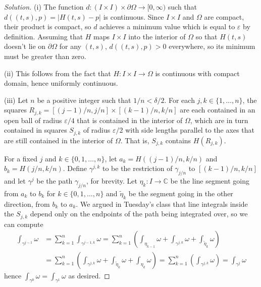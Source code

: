 \documentclass[10pt]{article}
\providecommand{\eps}{\varepsilon}
\providecommand{\CC}{\mathbb C}
\newenvironment{soln}{\begin{proof}[Solution]}{\end{proof}}
\providecommand{\abs}[1]{\left\lvert #1\right\rvert}
\begin{document}
\begin{soln}
    (i) The function $d\colon (I\times I)\times\partial\Omega\to[0,\infty)$
    such that $d((t,s),p) = \abs{H(t,s)-p}$ is continuous.
    Since $I\times I$ and $\Omega$ are compact,
    their product is compact, so $d$ achieves a minimum value
    which is equal to $\eps$ by definition.
    Assuming that $H$ maps $I\times I$ into the interior of $\Omega$ so that
    $H(t,s)$ doesn't lie on $\partial\Omega$ for any $(t,s)$,
    $d((t,s),p) > 0$ everywhere, so its minimum must be greater than zero.

    (ii) This follows from the fact that $H\colon I\times I\to\Omega$
    is continuous with compact domain, hence uniformly continuous.

    (iii) Let $n$ be a positive integer such that $1/n < \delta/2$.
    For each $j,k\in\{1,\dots,n\}$, the squares
    $R_{j,k} = [(j-1)/n,j/n]\times[(k-1)/n,k/n]$
    are each contained in an open ball
    of radius $\eps/4$ that is contained in the interior of $\Omega$,
    which are in turn contained in squares $S_{j,k}$ of radius $\eps/2$
    with side lengths parallel to the axes
    that are still contained in the interior of $\Omega$.
    That is, $S_{j,k}$ contains $H(R_{j,k})$.

    For a fixed $j$ and $k\in\{0,1,\dots,n\}$, let
    $a_k = H((j-1)/n, k/n)$ and $b_k = H(j/n,k/n)$.
    Define $\gamma^{j,k}$ to be the restriction of
    $\gamma_{j/n}$ to $[(k-1)/n,k/n]$
    and let $\gamma^j$ be the path $\gamma_{j/n}$, for brevity.
    Let $\eta_k\colon I\to\CC$ be the line segment going from $a_k$ to $b_k$
    for $k\in\{0,1,\dots,n\}$ and $\tilde\eta_k$ be the segment
    going in the other direction, from $b_k$ to $a_k$.
    We argued in Tuesday's class that
    line integrals inside the $S_{j,k}$ depend only on
    the endpoints of the path being integrated over, so we can compute
    \begin{align*}
	\int_{\gamma^{j-1}}\omega
	&= \sum_{k=1}^n \int_{\gamma^{j-1,k}}\omega
	= \sum_{k=1}^n \left(\int_{\eta_{k-1}}\omega
	+ \int_{\gamma^{j,k}}\omega + \int_{\tilde\eta_k}\omega\right)\\
	&= \sum_{k=1}^n\left(\int_{\gamma^{j,k}}\omega
	+ \int_{\tilde\eta_k}\omega + \int_{\eta_k}\omega\right)
	= \sum_{k=1}^n\left(\int_{\gamma^{j,k}}\omega\right)
	= \int_{\gamma^j}\omega
    \end{align*}
    hence $\int_{\gamma^0}\omega = \int_{\gamma^1}\omega$
    as desired.
\end{soln}
\end{document}
